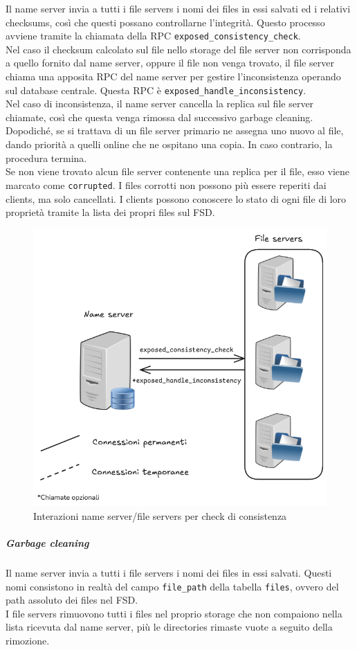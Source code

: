 \documentclass[a4paper, 12pt]{scrreprt}
\begin{document}
                Il name server invia a tutti i file servers i nomi dei files in essi salvati ed i relativi checksums, così che questi possano controllarne l'integrità. Questo processo avviene tramite la chiamata della RPC \texttt{exposed\_consistency\_check}.\\
                Nel caso il checksum calcolato sul file nello storage del file server non corrisponda a quello fornito dal name server, oppure il file non venga trovato, il file server chiama una apposita RPC del name server per gestire l'inconsistenza operando sul database centrale. Questa RPC è \texttt{exposed\_handle\_inconsistency}.\\
                Nel caso di inconsistenza, il name server cancella la replica sul file server chiamate, così che questa venga rimossa dal successivo garbage cleaning. Dopodiché, se si trattava di un file server primario ne assegna uno nuovo al file, dando priorità a quelli online che ne ospitano una copia. In caso contrario, la procedura termina.\\
                Se non viene trovato alcun file server contenente una replica per il file, esso viene marcato come \texttt{corrupted}. I files corrotti non possono più essere reperiti dai clients, ma solo cancellati. I clients possono conoscere lo stato di ogni file di loro proprietà tramite la lista dei propri files sul FSD.

                \begin{figure}[H]
                    \centering
                    \includegraphics[width = .4 \textwidth]{img/consistency.png}
                    \caption{Interazioni name server/file servers per check di consistenza}
                \end{figure}

            \subparagraph{Garbage cleaning}

                Il name server invia a tutti i file servers i nomi dei files in essi salvati. Questi nomi consistono in realtà del campo \texttt{file\_path} della tabella \texttt{files}, ovvero del path assoluto dei files nel FSD.\\
                I file servers rimuovono tutti i files nel proprio storage che non compaiono nella lista ricevuta dal name server, più le directories rimaste vuote a seguito della rimozione.
\end{document}
